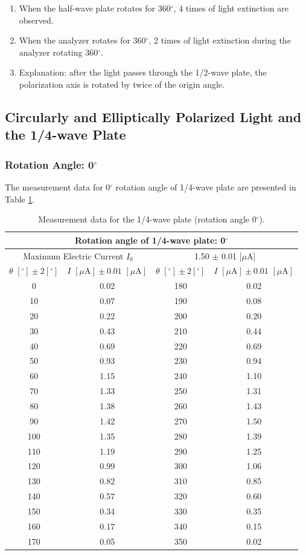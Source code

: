 \documentclass{article}
\begin{document}
\begin{enumerate}
\item When the half-wave plate rotates for 360$^\circ$, 4 times of light extinction are observed.
\item When the analyzer rotates for 360$^\circ$, 2 times of light extinction during the analyzer rotating 360$^\circ$. 
\item Explanation: after the light passes through the 1/2-wave plate, the polarization axis is rotated by twice of the origin angle.
\end{enumerate}

	\subsection{Circularly and Elliptically Polarized Light and the 1/4-wave Plate}

			\subsubsection{Rotation Angle: 0$^\circ$} \label{sec:0degree}

The measurement data for 0$^\circ$ rotation angle of 1/4-wave plate are presented in Table \ref{Table1/40}. 

\begin{table}[H]\centering
\begin{tabular}{cc||cc}
\toprule
\multicolumn{4}{c}{Rotation angle of 1/4-wave plate: 0$^\circ$}\\
\toprule
\multicolumn{2}{c}{Maximum Electric Current $I_0$} & \multicolumn{2}{c}{1.50 $\pm$ 0.01 [$\mu$A]}\\
\midrule
$\theta\,\,[^\circ] \pm 2[^\circ]$ & $I\,\,[\mu\text{A}] \pm 0.01\,\,[\mu\text{A}]$ & $\theta\,\,[^\circ] \pm 2[^\circ]$ & $I\,\,[\mu\text{A}] \pm 0.01\,\,[\mu\text{A}]$\\
\midrule
0 & 0.02 & 180 & 0.02 \\
10 & 0.07 & 190 & 0.08 \\
20 & 0.22 & 200 & 0.20 \\
30 & 0.43 & 210 & 0.44 \\
40 & 0.69 & 220 & 0.69 \\
50 & 0.93 & 230 & 0.94 \\
60 & 1.15 & 240 & 1.10 \\
70 & 1.33 & 250 & 1.31 \\
80 & 1.38 & 260 & 1.43 \\
90 & 1.42 & 270 & 1.50 \\
100 & 1.35 & 280 & 1.39 \\
110 & 1.19 & 290 & 1.25 \\
120 & 0.99 & 300 & 1.06 \\
130 & 0.82 & 310 & 0.85 \\
140 & 0.57 & 320 & 0.60 \\
150 & 0.34 & 330 & 0.35 \\
160 & 0.17 & 340 & 0.15 \\
170 & 0.05 & 350 & 0.02 \\ 
\bottomrule
\end{tabular}
\caption{Measurement data for the 1/4-wave plate (rotation angle 0$^\circ$).}\label{Table1/40}
\end{table}
\end{document}
